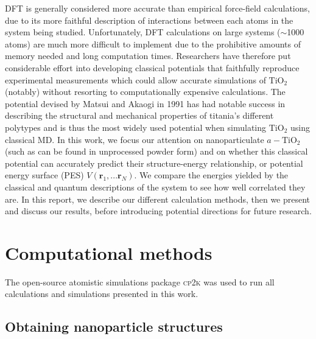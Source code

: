 \documentclass[aps,prb,twocolumn,amsmath,amssymb,superscriptaddress,longbibliography]{revtex4-1}
\newcommand\tab[1][1cm]{\hspace*{#1}} %
\begin{document}
\tab DFT is generally considered more accurate than empirical force-field calculations, due to its more faithful description of interactions between each atoms in the system being studied.
Unfortunately, DFT calculations on large systems ($\sim$1000 atoms) are much more difficult to implement due to the prohibitive amounts of memory needed and long computation times.
Researchers have therefore put considerable effort into developing classical potentials that faithfully reproduce experimental measurements which could allow accurate simulations of $\text{TiO}_2$ (notably) without resorting to computationally expensive calculations\cite{kim,MA_og,opt_FF}.
The potential devised by Matsui and Akaogi in 1991\cite{MA_og} has had notable success in describing the structural and mechanical properties of titania's different polytypes\cite{smith_collins,vvh1} and is thus the most widely used potential when simulating $\text{TiO}_2$ using classical MD. 
In this work, we focus our attention on nanoparticulate $a-\text{TiO}_2$ (such as can be found in unprocessed powder form) and on whether this classical potential can accurately predict their structure-energy relationship, or potential energy surface (PES) ${V(\textbf{r}_1,...\textbf{r}_N)}$.
We compare the energies yielded by the classical and quantum descriptions of the system to see how well correlated they are.
In this report, we describe our different calculation methods, then we present and discuss our results, before introducing potential directions for future research.




\section{Computational methods}

The open-source atomistic simulations package \textsc{cp2k}\cite{cp2k} was used to run all calculations and simulations presented in this work.

\subsection{Obtaining nanoparticle structures}
\end{document}
